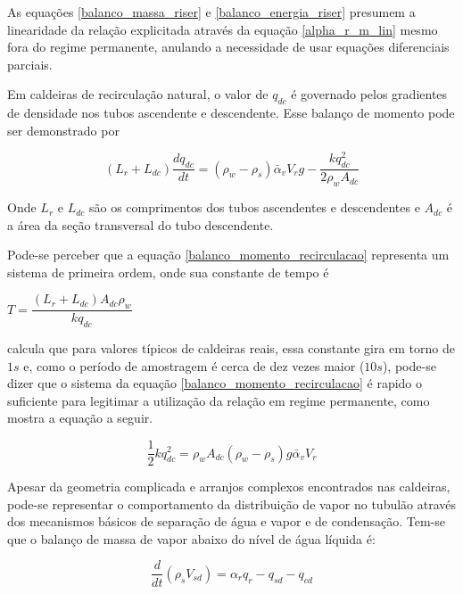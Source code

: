 As equações \ref{balanco_massa_riser} e \ref{balanco_energia_riser}
presumem a linearidade da relação explicitada através da equação
\ref{alpha_r_m_lin} mesmo fora do regime permanente, anulando a
necessidade de usar equações diferenciais parciais.

Em caldeiras de recirculação natural, o valor de $q_{dc}$ é governado
pelos gradientes de densidade nos tubos ascendente e descendente. Esse
balanço de momento pode ser demonstrado por

\begin{equation}
  (L_r + L_{dc}) \dfrac{d q_{dc}}{dt} = (\rho_w - \rho_s)
  \bar{\alpha}_v V_r g - \dfrac{k q_{dc}^2}{2 \rho_w A_{dc}}
  \label{balanco_momento_recirculacao}
\end{equation}

Onde $L_r$ e $L_{dc}$ são os comprimentos dos tubos ascendentes e
descendentes e $A_{dc}$ é a área da seção transversal do tubo
descendente.

Pode-se perceber que a equação \ref{balanco_momento_recirculacao}
representa um sistema de primeira ordem, onde sua constante de tempo é

\begin{center}
$ T = \dfrac{(L_r + L_{dc}) A_{dc} \rho_w}{k q_{dc}} $
\end{center}
  
 calcula que para valores típicos de caldeiras
reais, essa constante gira em torno de $1s$ e, como o período de
amostragem é cerca de dez vezes maior ($10s$), pode-se dizer que o
sistema da equação \ref{balanco_momento_recirculacao} é rapido o
suficiente para legitimar a utilização da relação em regime
permanente, como mostra a equação a seguir.

\begin{equation}
  \dfrac{1}{2} k q_{dc}^2 = \rho_w A_{dc} (\rho_w - \rho_s) g
  \bar{\alpha}_v V_r
  \label{q_dc}
\end{equation}

Apesar da geometria complicada e arranjos complexos encontrados nas
caldeiras, pode-se representar o comportamento da distribuição de
vapor no tubulão através dos mecanismos básicos de separação de água e
vapor e de condensação. Tem-se que o balanço de massa de vapor abaixo
do nível de água líquida é:

\begin{equation}
  \dfrac{d}{dt} (\rho_s V_{sd}) = \alpha_r q_r - q_{sd} - q_{cd}
  \label{balanco_massa_s_abaixo_nivel}
\end{equation}

